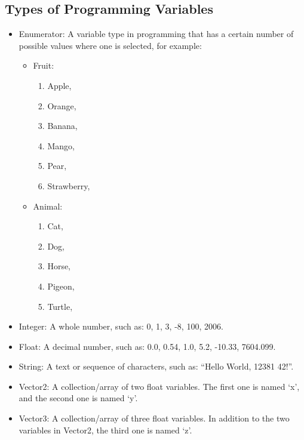 \documentclass[a4paper, 12pt]{article}
\begin{document}
\subsection{Types of Programming Variables}
\label{ProgDefinitionsSec}
\begin{itemize}
    \item{Enumerator: A variable type in programming that has a certain number of possible values where one is selected, for example:
    
    \begin{itemize}
    \item{Fruit:}
    	\begin{enumerate}
    	\item{Apple,}
    	\item{Orange,}
    	\item{Banana,}
    	\item{Mango,}
    	\item{Pear,}
    	\item{Strawberry,}
    	\end{enumerate}
    \item{Animal:}
        \begin{enumerate}
    	\item{Cat,}
    	\item{Dog,}
    	\item{Horse,}
    	\item{Pigeon,}
    	\item{Turtle,}
    	\end{enumerate}
    \end{itemize} 
    }   
    \item{Integer: A whole number, such as: 0, 1, 3, -8, 100, 2006.}
    
    \item{Float: A decimal number, such as: 0.0, 0.54, 1.0, 5.2, -10.33, 7604.099.}
    
    \item{String: A text or sequence of characters, such as: “Hello World, 12381 42!”.}
    
    \item{{\codefont Vector2}: A collection/array of two float variables. The first one is named ‘x’, and the second one is named ‘y’.}
    
    \item{{\codefont Vector3}: A collection/array of three float variables. In addition to the two variables in {\codefont Vector2}, the third one is named ‘z’.}
    

\end{itemize}
\end{document}
